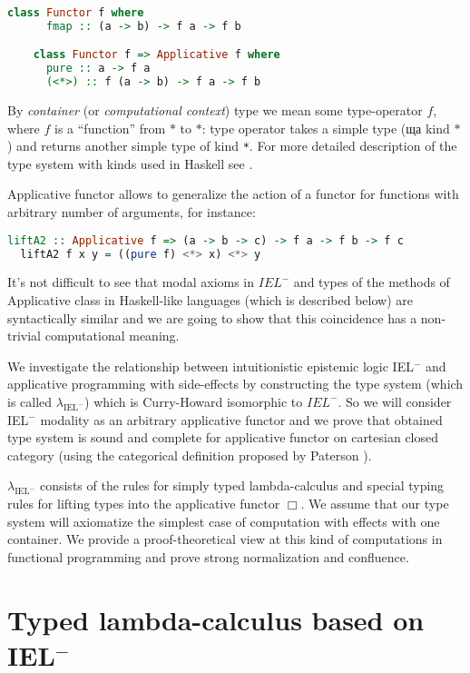 \documentclass[a4paper]{article}
\begin{document}
  \begin{lstlisting}[language=Haskell]
    class Functor f where
      fmap :: (a -> b) -> f a -> f b

    class Functor f => Applicative f where
      pure :: a -> f a
      (<*>) :: f (a -> b) -> f a -> f b
  \end{lstlisting}

  By \emph{container} (or \emph{computational context}) type we mean some type-operator $f$, where $f$ is a
  ``function'' from $*$ to $*$: type operator takes a simple type (ща kind $*$) and returns another
  simple type of kind \verb"*". For more detailed description of the type system with kinds used in
  Haskell see \cite{Morten}.

Applicative functor allows to generalize the action of a functor for functions with arbitrary number of arguments, for instance:
  \begin{lstlisting}[language=Haskell]
  liftA2 :: Applicative f => (a -> b -> c) -> f a -> f b -> f c
  liftA2 f x y = ((pure f) <*> x) <*> y
  \end{lstlisting}

  It's not difficult to see that modal axioms in $IEL^{-}$ and types of the methods of Applicative class in
  Haskell-like languages (which is described below) are syntactically similar and we are going to show that
  this coincidence has a non-trivial computational meaning.

  We investigate the relationship between intuitionistic epistemic logic IEL$^{-}$ and applicative programming with side-effects
  by constructing the type system (which is called $\lambda_{\text{IEL}^{-}}$) which is Curry-Howard isomorphic to $IEL^{-}$.
  So we will consider IEL$^{-}$ modality as an arbitrary applicative functor and we prove that obtained type system
  is sound and complete for applicative functor on cartesian closed category (using the categorical definition proposed by Paterson \cite{Cons}).

  $\lambda_{\text{IEL}^{-}}$ consists of the rules for simply typed lambda-calculus and special typing rules for
  lifting types into the applicative functor $\Box$. We assume that our type system will
  axiomatize the simplest case of computation with effects with one container. We provide a proof-theoretical
  view at this kind of computations in functional programming and prove strong normalization and confluence.

  \section{Typed lambda-calculus based on IEL$^{-}$}
\end{document}
